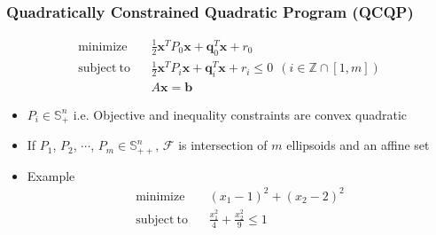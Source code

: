 \subsubsection*{Quadratically Constrained Quadratic Program (QCQP)}
\begin{equation}\begin{aligned}
    \mathrm{minimize}~~&~~\frac 1 2 \mathbf{x}^TP_0\mathbf{x} + \mathbf{q}_0^T\mathbf{x} + r_0 \\
    \mathrm{subject~to}~~&~~\frac 1 2 \mathbf{x}^TP_i\mathbf{x} + \mathbf{q}_i^T\mathbf{x} + r_i \leq 0~~(i \in \mathbb{Z} \cap [1,m]) \\
        &~~A\mathbf{x} = \mathbf{b}
\end{aligned}\end{equation}
\begin{itemize}
    \item $P_i \in \mathbb{S}^n_{+}$ i.e. Objective and inequality constraints are convex quadratic
    \item If $P_1$, $P_2$, $\cdots$, $P_m \in \mathbb{S}^n_{++}$, $\mathcal{F}$ is intersection of $m$ ellipsoids and an affine set
    \item Example
    \begin{equation}\begin{aligned}
        \mathrm{minimize}~~&~~(x_1 - 1)^2 + (x_2 - 2)^2 \\
        \mathrm{subject~to}~~&~~\frac {x_1^2} 4 + \frac {x_2^2} 9 \leq 1
    \end{aligned}\end{equation}
\end{itemize}
